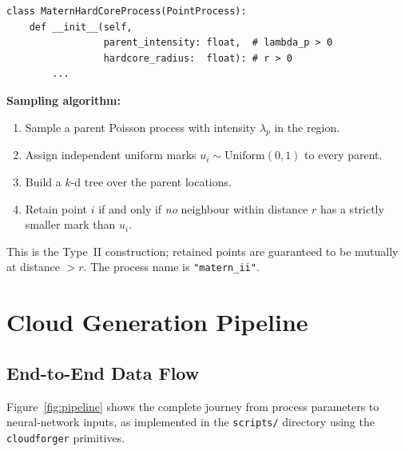 \documentclass[11pt, a4paper]{article}
\newcommand{\code}[1]{\texttt{#1}}
\newcommand{\pyfile}[1]{\texttt{\small #1}}
\begin{document}
\begin{lstlisting}
class MaternHardCoreProcess(PointProcess):
    def __init__(self,
                 parent_intensity: float,  # lambda_p > 0
                 hardcore_radius:  float): # r > 0
        ...
\end{lstlisting}

\textbf{Sampling algorithm:}
\begin{enumerate}
  \item Sample a parent Poisson process with intensity
        $\lambda_p$ in the region.
  \item Assign independent uniform marks $u_i \sim \mathrm{Uniform}(0,1)$
        to every parent.
  \item Build a $k$-d tree over the parent locations.
  \item Retain point $i$ if and only if \emph{no} neighbour within
        distance $r$ has a strictly smaller mark than $u_i$.
\end{enumerate}

This is the Type~II construction; retained points are guaranteed to be
mutually at distance $> r$.  The process name is \code{"matern\_ii"}.

\section{Cloud Generation Pipeline}
\label{sec:pipeline}

\subsection{End-to-End Data Flow}

Figure~\ref{fig:pipeline} shows the complete journey from process
parameters to neural-network inputs, as implemented in the
\pyfile{scripts/} directory using the \code{cloudforger} primitives.
\end{document}
